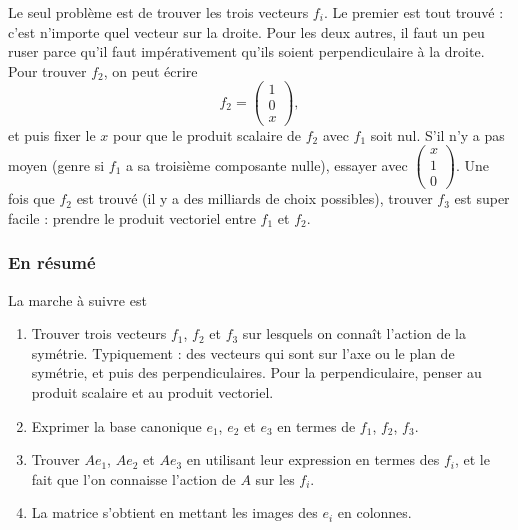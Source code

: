 Le seul problème est de trouver les trois vecteurs $f_i$. Le premier est tout trouvé : c'est n'importe quel vecteur sur la droite. Pour les deux autres, il faut un peu ruser parce qu'il faut impérativement qu'ils soient perpendiculaire à la droite. Pour trouver $f_2$, on peut écrire
\begin{equation}
	f_2=\begin{pmatrix}
		1	\\ 
		0	\\ 
		x	
	\end{pmatrix},
\end{equation}
et puis fixer le $x$ pour que le produit scalaire de $f_2$ avec $f_1$ soit nul. S'il n'y a pas moyen (genre si $f_1$ a sa troisième composante nulle), essayer avec $\begin{pmatrix}
	x	\\ 
	1	\\ 
	0	
\end{pmatrix}$. Une fois que $f_2$ est trouvé (il y a des milliards de choix possibles), trouver $f_3$ est super facile : prendre le produit vectoriel entre $f_1$ et $f_2$.

\subsubsection{En résumé}
La marche à suivre est

\begin{enumerate}

	\item
		Trouver trois vecteurs $f_1$, $f_2$ et $f_3$ sur lesquels on connaît l'action de la symétrie. Typiquement : des vecteurs qui sont sur l'axe ou le plan de symétrie, et puis des perpendiculaires. Pour la perpendiculaire, penser au produit scalaire et au produit vectoriel.

	\item
		Exprimer la base canonique $e_1$, $e_2$ et $e_3$ en termes de $f_1$, $f_2$, $f_3$.

	\item
		Trouver $Ae_1$, $Ae_2$ et $Ae_3$ en utilisant leur expression en termes des $f_i$, et le fait que l'on connaisse l'action de $A$ sur les $f_i$.

	\item
		La matrice s'obtient en mettant les images des $e_i$ en colonnes.
\end{enumerate}


